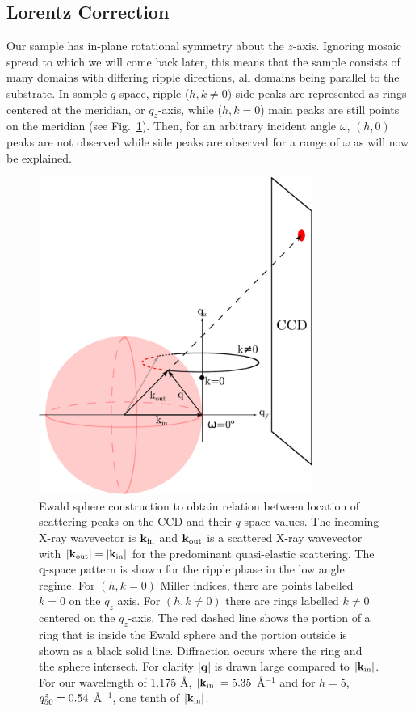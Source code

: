 \subsection{Lorentz Correction}\label{sec:Lorentz_correction}
Our sample has in-plane rotational symmetry about the $z$-axis. 
Ignoring mosaic spread to which we will come back later, this means that the sample 
consists of many domains with differing ripple directions, all domains
being parallel to the substrate.  
In sample $q$-space, ripple ($h,k\neq 0$) side peaks are represented as rings 
centered at the meridian, or $q_z$-axis, 
while ($h,k=0$) main peaks are still points on the meridian 
(see Fig.~\ref{fig:ripple_sample_qspace}). 
Then, for an arbitrary incident angle $\omega$, $(h,0)$ peaks are not observed
while side peaks are observed for a range of $\omega$ as will now be explained. 

\begin{figure}[htbp]
  \centering
  \includegraphics[width=0.8\textwidth]{figures/ripple/analysis/ripple_sample_qspace}
  \caption{Ewald sphere construction to obtain relation between location of 
  scattering peaks on the CCD and their $q$-space values. The incoming X-ray 
  wavevector is $\mathbf{k}_{\mathrm{in}}$ and $\mathbf{k}_{\mathrm{out}}$ is a scattered X-ray wavevector with 
  $|\mathbf{k}_{\mathrm{out}}|=|\mathbf{k}_{\mathrm{in}}|$ for the predominant quasi-elastic scattering. 
  The $\mathbf{q}$-space pattern is shown for the ripple phase in the low angle 
  regime. For $(h, k=0)$ Miller indices, there are points labelled $k=0$ on the 
  $q_z$ axis.  
  For $(h,k\neq0)$ there are rings labelled $k\neq0$ centered on the 
  $q_z$-axis. The red dashed line shows the portion of a ring that is inside 
  the Ewald sphere and the portion outside is shown as a black solid line. 
  Diffraction occurs where the ring and the sphere intersect.  For clarity 
  $|\mathbf{q}|$ is drawn large compared to $|\mathbf{k}_{\mathrm{in}}|$. For our wavelength
	of 1.175 \AA, $|\mathbf{k}_{\mathrm{in}}|=5.35$ \AA$^{-1}$ and for $h=5$,
  $q_{50}^z=0.54$ \AA$^{-1}$, one tenth of $|\mathbf{k}_{\mathrm{in}}|$.}
  \label{fig:ripple_sample_qspace}
\end{figure}

